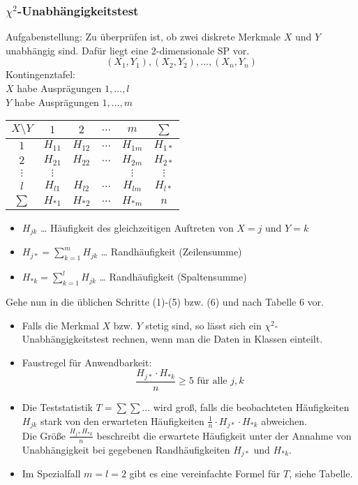 \documentclass{scrreprt}
\begin{document}
\subsubsection[chi-quadrat-Unabhängigkeitstest]{$\chi^2$-Unabhängigkeitstest}
Aufgabenstellung: Zu überprüfen ist, ob zwei diskrete Merkmale $X$ und $Y$ unabhängig sind. Dafür liegt eine 2-dimensionale SP vor.
$$(X_1,Y_1), (X_2, Y_2), \ldots, (X_n, Y_n)$$
Kontingenztafel:\\
$X$ habe Ausprägungen $1, \ldots, l$\\
$Y$ habe Ausprägungen $1, \ldots, m$\\
\begin{tabular}{c | c c c c | c}
$X\setminus Y$ & $1$ & $2$ & $\dots$ & $m$ & $\sum$\\\hline
$1$ & $H_{11}$ & $H_{12}$ & $\dots$ & $H_{1m}$ & $H_{1 *}$\\
$2$ & $H_{21}$ & $H_{22}$ & $\dots$ & $H_{2m}$ & $H_{2 *}$\\
$\vdots$ & $\vdots$ &  &  & $\vdots$ & $\vdots$\\
$l$ & $H_{l1}$ & $H_{l2}$ & $\dots$ & $H_{lm}$ & $H_{l *}$\\\hline
$\sum$ & $H_{* 1}$ & $H_{* 2}$ & $\dots$ & $H_{* m}$ & $n$
\end{tabular}
\begin{itemize}
\item $H_{jk}$ … Häufigkeit des gleichzeitigen Auftreten von $X=j$ und $Y=k$
\item $H_{j*}=\sum_{k=1}^m H_{jk}$ … Randhäufigkeit (Zeilensumme)
\item $H_{* k} =\sum_{k=1}^l H_{jk}$ … Randhäufigkeit (Spaltensumme)
\end{itemize}
Gehe nun in die üblichen Schritte (1)-(5) bzw. (6) und nach Tabelle 6 vor.

\begin{itemize}
\item Falls die Merkmal $X$ bzw. $Y$ stetig sind, so lässt sich ein $\chi^2$-Unabhängigkeitstest rechnen, wenn man die Daten in Klassen einteilt.
\item Faustregel für Anwendbarkeit:
$$\frac{H_{j*} \cdot H_{* k}}{n}\geq 5 \text{ für alle }j,k$$
\item Die Teststatistik $T=\sum\sum \dots$ wird groß, falls die beobachteten Häufigkeiten $H_{jk}$ stark von den erwarteten Häufigkeiten $\frac{1}{n}\cdot H_{j*} \cdot H_{*k}$ abweichen.\\
Die Größe $\frac{H_{j*}H_{*k}}{n}$ beschreibt die erwartete Häufigkeit unter der Annahme von Unabhängigkeit bei gegebenen Randhäufigkeiten $H_{j*}$ und $H_{*k}$.
\item Im Spezialfall $m=l=2$ gibt es eine vereinfachte Formel für $T$, siehe Tabelle.
\end{itemize}
\end{document}
